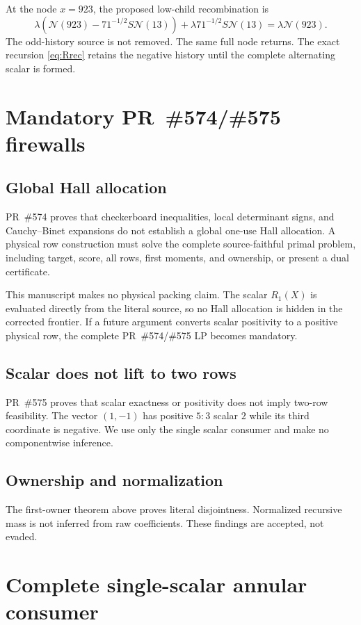 \documentclass[11pt]{article}
\newcommand{\Source}{\mathcal N}
\begin{document}
At the node $x=923$, the proposed low-child recombination is
\[
 \lambda(\Source(923)-71^{-1/2}S\Source(13))
 +\lambda71^{-1/2}S\Source(13)
 =\lambda\Source(923).
\]
The odd-history source is not removed.  The same full node returns.  The exact recursion \eqref{eq:Rrec} retains the negative history until the complete alternating scalar is formed.

\section{Mandatory PR~\#574/\#575 firewalls}

\subsection{Global Hall allocation}
PR~\#574 proves that checkerboard inequalities, local determinant signs, and Cauchy--Binet expansions do not establish a global one-use Hall allocation.  A physical row construction must solve the complete source-faithful primal problem, including target, score, all rows, first moments, and ownership, or present a dual certificate.

This manuscript makes no physical packing claim.  The scalar $R_1(X)$ is evaluated directly from the literal source, so no Hall allocation is hidden in the corrected frontier.  If a future argument converts scalar positivity to a positive physical row, the complete PR~\#574/\#575 LP becomes mandatory.

\subsection{Scalar does not lift to two rows}
PR~\#575 proves that scalar exactness or positivity does not imply two-row feasibility.  The vector $(1,-1)$ has positive $5{:}3$ scalar $2$ while its third coordinate is negative.  We use only the single scalar consumer and make no componentwise inference.

\subsection{Ownership and normalization}
The first-owner theorem above proves literal disjointness.  Normalized recursive mass is not inferred from raw coefficients.  These findings are accepted, not evaded.

\section{Complete single-scalar annular consumer}
\end{document}
